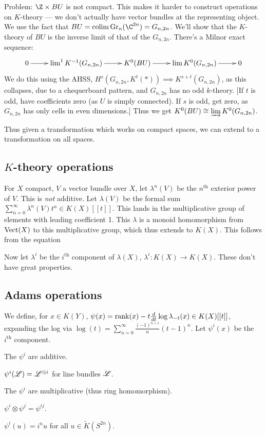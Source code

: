 \documentclass[11pt]{article}
\begin{document}
\begin{MarkusKtheoryPractice}
Problem: $\Z\times BU$ is not compact. This makes it harder to construct operations on $K$-theory --- we don't actually have vector bundles at the representing object. We use the fact that $BU=\colim \text{Gr}_n(\C^{2n})=G_{n,2n}$. We'll show that the $K$-theory of $BU$ is the inverse limit of that of the $G_{n,2n}$. There's a Milnor exact sequence:
\[\xymatrix{
0\ar[r]&\lim^1 K^{-1}(G_{n,2n})\ar[r]&K^0(BU)\ar[r]&\lim K^0(G_{n,2n})\ar[r]&0}\]
We do this using the AHSS, $H^s(G_{n,2n},K^t(\ast))\implies K^{s+t}(G_{n,2n})$, as this collapses, due to a chequerboard pattern, and $G_{n,2n}$ has no odd $k$-theory. [If $t$ is odd, have coefficients zero (as $U$ is simply connected). If $s$ is odd, get zero, as $G_{n,2n}$ has only cells in even dimensions.] Thus we get $K^0(BU)\cong \varinjlim K^0(G_{n,2n})$.

Thus given a transformation which works on compact spaces, we can extend to a transformation on all spaces.
\subsection*{$K$-theory operations}
For $X$ compact, $V$ a vector bundle over $X$, let $\lambda^n(V)$ be the $n^\text{th}$ exterior power of $V$. This is \emph{not} additive. Let $\lambda(V)$ be the formal sum $\sum_{n=0}^\infty \lambda^n(V) t^n\in K(X)[[t]]$. This lands in the multiplicative group of elements with leading coefficient 1. This $\lambda$ is a monoid homomorphism from $\operatorname{Vect}(X)$ to this multiplicative group, which thus extends to $K(X)$. This follows from the equation %

Now let $\lambda^i$ be the $i^\text{th}$ component of $\lambda(X)$, $\lambda^i:K(X)\to K(X)$. These don't have great properties.
\subsection*{Adams operations}
We define, for $x\in K(Y)$, $\psi(x)=\operatorname{rank}(x)-t\frac{d}{dt}\log \lambda_{-t}(x)\in K(X)[[t]]$, expanding the log via $\log(t)=\sum_{n=0}^\infty \frac{(-1)^{n+1}}{n}(t-1)^n$. Let $\psi^i(x)$ be the $i^\text{th}$ component.
\begin{itemise}
\item The $\psi^i$ are additive.
\item $\psi^i(\mathscr{L})=\mathscr{L}^{\otimes i}$ for line bundles $\mathscr{L}$.
\item The $\psi^i$ are multiplicative (thus ring homomorphism).
\item $\psi^i\otimes\psi^j=\psi^{ij}$.
\item $\psi^i(u)=i^nu$ for all $u\in\widetilde K(S^{2n})$.
\end{itemise}

\pagebreak
\end{MarkusKtheoryPractice}
\end{document}
